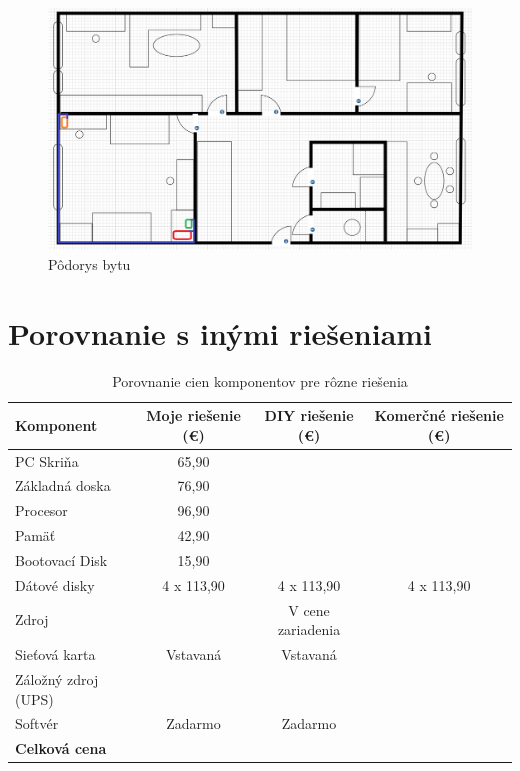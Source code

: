 \documentclass[12pt,oneside,slovak,a4paper]{article}
\begin{document}
\begin{figure}[H]
	\centering
	\captionsetup{justification=centering,margin=2cm}
	\includegraphics[width=\linewidth]{./images/nakres-bytu.png}
	\centering
	\caption{Pôdorys bytu}
	\label{fig:floorplan}
\end{figure}

\section{Porovnanie s inými riešeniami}
\begin{table}[h]
\centering
\begin{tabular}{|l|c|c|c|}
\hline
\textbf{Komponent} & \textbf{Moje riešenie (€)} & \textbf{DIY riešenie (€)} & \textbf{Komerčné riešenie (€)} \\ \hline
PC Skriňa & 65,90 &  &  \\ \hline
Základná doska & 76,90 &  &  \\ \hline
Procesor & 96,90 &  &  \\ \hline
Pamäť & 42,90 &  &  \\ \hline
Bootovací Disk & 15,90 &  &  \\ \hline
Dátové disky & 4 x 113,90 & 4 x 113,90 & 4 x 113,90 \\ \hline
Zdroj &  & V cene zariadenia &  \\ \hline
Sieťová karta & Vstavaná & Vstavaná &  \\ \hline
Záložný zdroj (UPS) &  &  &  \\ \hline
Softvér & Zadarmo & Zadarmo &  \\ \hline
\textbf{Celková cena} &  &  &  \\ \hline
\end{tabular}
\caption{Porovnanie cien komponentov pre rôzne riešenia}
\end{table}
\end{document}
